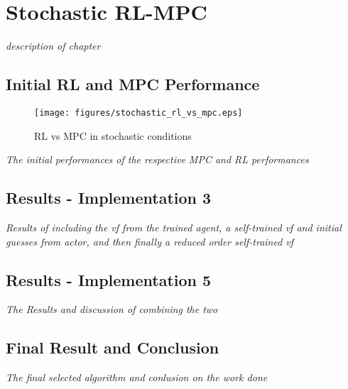 \chapter{Stochastic RL-MPC}
\label{chapter:stochastic_RL_MPC}

\emph{description of chapter}

\section{Initial RL and MPC Performance}

\begin{figure}[H]
	\centering
	\texttt{[image: figures/stochastic\_rl\_vs\_mpc.eps]}
	\caption{RL vs MPC in stochastic conditions}
	\label{fig:stochastic-rl-vs-mpc}
\end{figure}

\emph{The initial performances of the respective MPC and RL performances}

\section{Results - Implementation 3}
\emph{Results of including the vf from the trained agent, a self-trained vf and initial guesses from actor, and then finally a reduced order self-trained vf}

\section{Results - Implementation 5}
\emph{The Results and discussion of combining the two}


\section{Final Result and Conclusion}
\emph{The final selected algorithm and conlusion on the work done}
